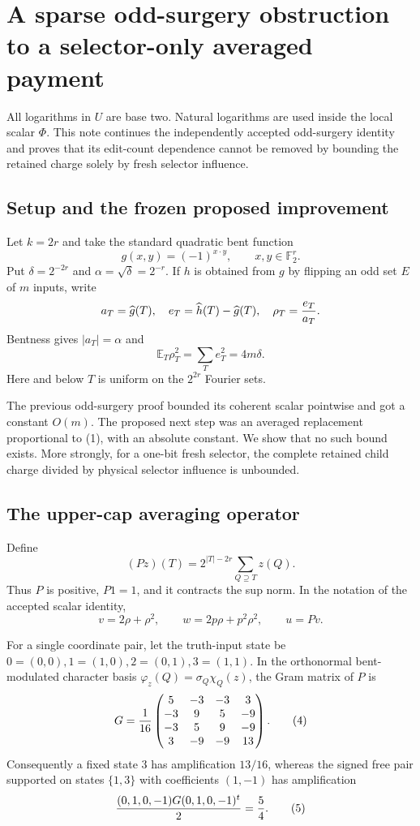 \section*{A sparse odd-surgery obstruction to a selector-only averaged payment}

All logarithms in $U$ are base two.  Natural logarithms are used inside the
local scalar $\Phi$.  This note continues the independently accepted
odd-surgery identity and proves that its edit-count dependence cannot be
removed by bounding the retained charge solely by fresh selector influence.

\subsection*{Setup and the frozen proposed improvement}

Let $k=2r$ and take the standard quadratic bent function
\[
 g(x,y)=(-1)^{x\cdot y},\qquad x,y\in\mathbb F_2^r.
\]
Put $\delta=2^{-2r}$ and $\alpha=\sqrt\delta=2^{-r}$.  If $h$ is obtained
from $g$ by flipping an odd set $E$ of $m$ inputs, write
\[
 a_T=\widehat g(T),\quad e_T=\widehat h(T)-\widehat g(T),
 \quad \rho_T={e_T\over a_T}.
\]
Bentness gives $|a_T|=\alpha$ and
\[
 \mathbb E_T\rho_T^2=\sum_Te_T^2=4m\delta.               \tag{1}
\]
Here and below $T$ is uniform on the $2^{2r}$ Fourier sets.

The previous odd-surgery proof bounded its coherent scalar pointwise and got
a constant $O(m)$.  The proposed next step was an averaged replacement
proportional to (1), with an absolute constant.  We show that no such bound
exists.  More strongly, for a one-bit fresh selector, the complete retained
child charge divided by physical selector influence is unbounded.

\subsection*{The upper-cap averaging operator}

Define
\[
 (Pz)(T)=2^{|T|-2r}\sum_{Q\supseteq T}z(Q).              \tag{2}
\]
Thus $P$ is positive, $P1=1$, and it contracts the sup norm.  In the notation
of the accepted scalar identity,
\[
 v=2\rho+\rho^2,\qquad w=2p\rho+p^2\rho^2,\qquad u=Pv.  \tag{3}
\]

For a single coordinate pair, let the truth-input state be
$0=(0,0),1=(1,0),2=(0,1),3=(1,1)$.  In the orthonormal bent-modulated
character basis $\varphi_z(Q)=\sigma_Q\chi_Q(z)$, the Gram matrix of $P$ is
\[
 G={1\over16}\begin{pmatrix}
 5&-3&-3&3\\
 -3&9&5&-9\\
 -3&5&9&-9\\
 3&-9&-9&13
 \end{pmatrix}.                                         \tag{4}
\]
Consequently a fixed state $3$ has amplification $13/16$, whereas the
signed free pair supported on states $\{1,3\}$ with coefficients $(1,-1)$
has amplification
\[
 {(0,1,0,-1)G(0,1,0,-1)^t\over2}={5\over4}.             \tag{5}
\]

